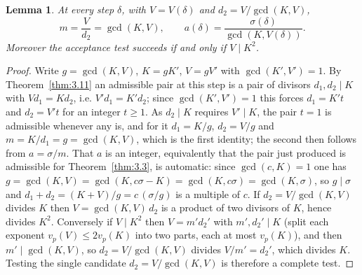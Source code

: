 \documentclass[11pt, a4paper]{article}
\theoremstyle{plain}
\newtheorem{lemma}[theorem]{Lemma}
\theoremstyle{definition}
\begin{document}
\begin{lemma}\label{lem:m_gcd}
At every step $\delta$, with $V=V(\delta)$ and $d_2=V/\gcd(K,V)$,
$$m=\frac{V}{d_2}=\gcd(K,V),\qquad a(\delta)=\frac{\sigma(\delta)}{\gcd(K,V(\delta))} .$$
Moreover the acceptance test succeeds if and only if $V\mid K^{2}$.
\end{lemma}
\begin{proof}
Write $g=\gcd(K,V)$, $K=gK'$, $V=gV'$ with $\gcd(K',V')=1$. By Theorem~\ref{thm:3.11} an admissible pair at this step is a pair of divisors $d_1,d_2\mid K$ with $Vd_1=Kd_2$, i.e. $V'd_1=K'd_2$; since $\gcd(K',V')=1$ this forces $d_1=K't$ and $d_2=V't$ for an integer $t\ge1$. As $d_2\mid K$ requires $V'\mid K$, the pair $t=1$ is admissible whenever any is, and for it $d_1=K/g$, $d_2=V/g$ and $m=K/d_1=g=\gcd(K,V)$, which is the first identity; the second then follows from $a=\sigma/m$. That $a$ is an integer, equivalently that the pair just produced is admissible for Theorem~\ref{thm:3.3}, is automatic: since $\gcd(c,K)=1$ one has $g=\gcd(K,V)=\gcd(K,c\sigma-K)=\gcd(K,c\sigma)=\gcd(K,\sigma)$, so $g\mid\sigma$ and $d_1+d_2=(K+V)/g=c\,(\sigma/g)$ is a multiple of $c$. If $d_2=V/\gcd(K,V)$ divides $K$ then $V=\gcd(K,V)\,d_2$ is a product of two divisors of $K$, hence divides $K^{2}$. Conversely if $V\mid K^{2}$ then $V=m'd_2'$ with $m',d_2'\mid K$ (split each exponent $v_p(V)\le 2v_p(K)$ into two parts, each at most $v_p(K)$), and then $m'\mid\gcd(K,V)$, so $d_2=V/\gcd(K,V)$ divides $V/m'=d_2'$, which divides $K$. Testing the single candidate $d_2=V/\gcd(K,V)$ is therefore a complete test.
\end{proof}
\end{document}
